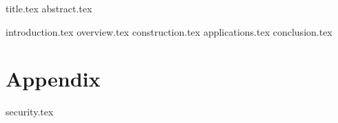 \documentclass[11pt]{llncs}
\begin{document}
{title.tex}
\thispagestyle{plain}
{abstract.tex}

{introduction.tex}
{overview.tex}
{construction.tex}
\ifshort\else
{applications.tex}
\fi
{conclusion.tex}

\appendix
\section*{Appendix}
{security.tex}



\end{document}
